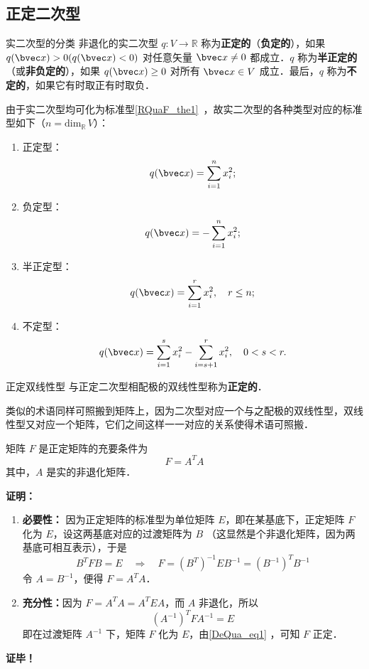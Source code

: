 \subsection{正定二次型}
\begin{definition}{实二次型的分类}
非退化的实二次型 $q:V\rightarrow\mathbb R$ 称为\textbf{正定的}（\textbf{负定的}），如果 $q(\bvec x)>0(q(\bvec x)<0)$ 对任意矢量 $\bvec x\neq0$ 都成立．$q$ 称为\textbf{半正定的}（或\textbf{非负定的}），如果 $q(\bvec x)\geq0$ 对所有 $\bvec x\in V$ 成立．最后，$q$ 称为\textbf{不定的}，如果它有时取正有时取负．
\end{definition}
由于实二次型均可化为标准型\autoref{RQuaF_the1}~，故实二次型的各种类型对应的标准型如下（$n=\mathrm{dim}_\mathbb R \,V$）：
\begin{enumerate}
\item 正定型：\begin{equation}\label{DeQua_eq1}
q(\bvec x)=\sum_{i=1}^n x_i^2;
\end{equation}
\item 负定型：\begin{equation}
q(\bvec x)=-\sum_{i=1}^n x_i^2;
\end{equation}
\item 半正定型：\begin{equation}
q(\bvec x)=\sum_{i=1}^r x_i^2,\quad r\leq n;
\end{equation}
\item 不定型：\begin{equation}
q(\bvec x)=\sum_{i=1}^s x_i^2-\sum_{i=s+1}^r x_i^2,\quad0<s< r.
\end{equation}
\end{enumerate}
\begin{definition}{正定双线性型}
与正定二次型相配极的双线性型称为\textbf{正定的}．
\end{definition}
类似的术语同样可照搬到矩阵上，因为二次型对应一个与之配极的双线性型，双线性型又对应一个矩阵，它们之间这样一一对应的关系使得术语可照搬．
\begin{theorem}{}
矩阵 $F$ 是正定矩阵的充要条件为
\begin{equation}
F=A^TA
\end{equation}
其中，$A$ 是实的非退化矩阵．
\end{theorem}
\textbf{证明：}
\begin{enumerate}
\item \textbf{必要性：}
因为正定矩阵的标准型为单位矩阵 $E$，即在某基底下，正定矩阵 $F$ 化为 $E$，设这两基底对应的过渡矩阵为 $B$ （这显然是个非退化矩阵，因为两基底可相互表示），于是
\begin{equation}
B^TFB=E\quad\Rightarrow\quad F={(B^T)}^{-1}EB^{-1}={(B^{-1})}^TB^{-1}
\end{equation}
令 $A=B^{-1}$，便得 $F=A^TA$．
\item \textbf{充分性：}因为 $F=A^TA=A^TEA$，而 $A$ 非退化，所以
\begin{equation}
{(A^{-1})}^TFA^{-1}=E
\end{equation}
即在过渡矩阵 $A^{-1}$ 下，矩阵 $F$ 化为 $E$，由\autoref{DeQua_eq1} ，可知 $F$ 正定．
\end{enumerate}
\textbf{证毕！}
